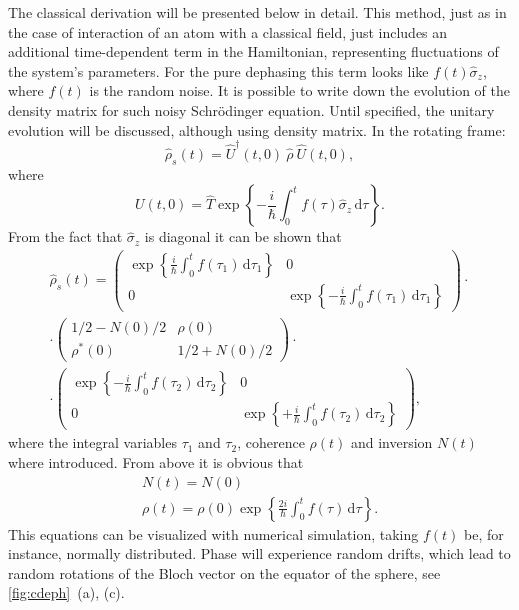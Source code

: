 \documentclass[12pt]{report}
\newcommand{\diff}{\,\mathrm{d}}
\newcommand{\rbrkt}[1]{\left( #1 \right)}
\numberwithin{equation}{section}
\begin{document}
The classical derivation will be presented below in detail. This method, just as in the case of interaction of an atom with a classical field, just includes an additional time-dependent term in the Hamiltonian, representing fluctuations of the system's parameters. For the pure dephasing this term looks like $f(t) \hat \sigma_z$, where $f(t)$ is the random noise. It is possible to write down the evolution of the density matrix for such noisy Schrödinger equation. Until specified, the unitary evolution will be discussed, although using density matrix. In the rotating frame:
\[
\hat \rho_s (t) = \hat U^\dag(t, 0)\ \hat\rho\ \hat U(t, 0), 
\]
where 
\[
U(t, 0) = \hat T \exp \left\{-\frac{i}{\hbar} \int_0^t f(\tau)\hat \sigma_z \diff\tau\right\}.
\]
From the fact that $\hat \sigma_z$ is diagonal it can be shown that
\[
\begin{gathered}
\hat \rho_s (t) = \rbrkt{\begin{matrix}
\exp \left\{\frac{i}{\hbar} \int_0^t f(\tau_1) \diff\tau_1\right\} & 0\\
0 & \exp \left\{-\frac{i}{\hbar} \int_0^t f(\tau_1) \diff\tau_1\right\}
\end{matrix}}\cdot\\
\cdot\rbrkt{\begin{matrix}
1/2 - N(0)/2 & \rho(0) \\
\rho^*(0) & 1/2 + N(0)/2 
\end{matrix}}\cdot\\
\cdot\rbrkt{\begin{matrix}
\exp \left\{-\frac{i}{\hbar} \int_0^t f(\tau_2)\diff\tau_2\right\} & 0\\
0 & \exp \left\{+\frac{i}{\hbar} \int_0^t f(\tau_2)\diff\tau_2\right\}
\end{matrix}},
\end{gathered}
\] 
where the integral variables $\tau_1$ and $\tau_2$, coherence $\rho(t)$ and inversion $N(t)$ where introduced. From above it is obvious that
\begin{gather}
N(t) = N(0)\\
\rho(t) = \rho(0)\exp \left\{ \frac{2i}{\hbar}\int_0^t f(\tau)  \diff \tau \right\}. \label{eq:rho_t}
\end{gather}
This equations can be visualized with numerical simulation, taking $f(t)$ be, for instance, normally distributed. Phase will experience random drifts, which lead to random rotations of the Bloch vector on the equator of the sphere, see \autoref{fig:cdeph}~(a), (c).
\end{document}
